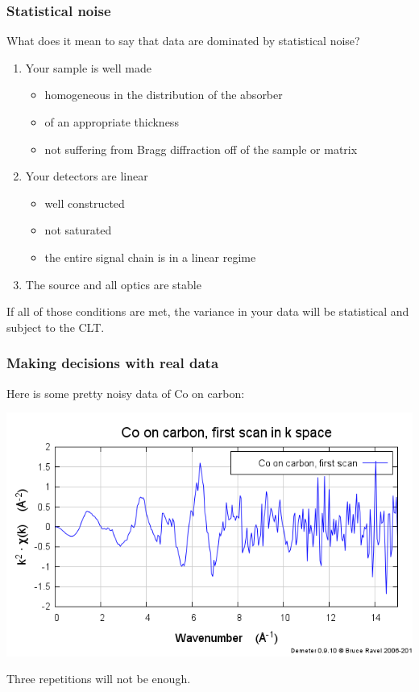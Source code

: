 \documentclass[10pt, xcolor=x11names, compress]{beamer}
\begin{document}
\begin{frame}
  \frametitle{Statistical noise}
  What does it mean to say that data are dominated by statistical
  noise?
  \begin{enumerate}
  \item Your sample is well made
    \begin{itemize}
    \item homogeneous in the distribution of the absorber
    \item of an appropriate thickness
    \item not suffering from Bragg diffraction off of the sample or matrix
    \end{itemize}
  \item Your detectors are linear
    \begin{itemize}
    \item well constructed
    \item not saturated
    \item the entire signal chain is in a linear regime
    \end{itemize}
  \item The source and all optics are stable
  \end{enumerate}
  \begin{alertblock}{}
    If all of those conditions are met, the variance in your data will
    be statistical and subject to the CLT.
  \end{alertblock}
\end{frame}

\begin{frame}
  \frametitle{Making decisions with real data}
  \begin{center}
    Here is some pretty noisy data of Co on carbon:

    \bigskip

    \includegraphics[width=0.7\linewidth]{images/firstscan.png}

    \bigskip

    Three repetitions will not be enough.
  \end{center}
\end{frame}
\end{document}

